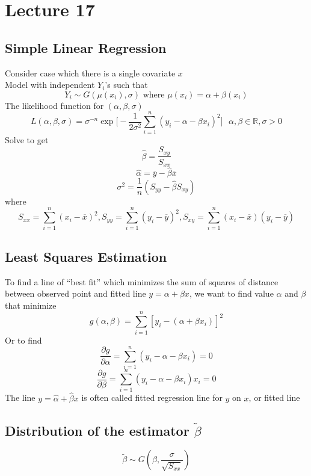 \documentclass[11pt]{article}
\newcommand{\R}{{\mathbb{R}}}
\begin{document}
\section{Lecture 17}
\subsection{Simple Linear Regression}
Consider case which there is a single covariate $x$ \\
Model with independent $Y_i$'s such that \[Y_i\sim G(\mu(x_i),\sigma)\text{ where }\mu(x_i)=\alpha+\beta(x_i)\]
The likelihood function for $(\alpha,\beta,\sigma)$
\[L(\alpha,\beta,\sigma) = \sigma^{-n}\exp\Big[-\frac{1}{2\sigma^2}\sum_{i=1}^{n}(y_i-\alpha-\beta x_i)^2\Big]\ \ \ \alpha,\beta\in\R, \sigma>0\]
Solve to get 
\[\hat{\beta} = \frac{S_{xy}}{S_{xx}}\]
\[\hat{\alpha} = \overline{y}-\hat{\beta}\overline{x}\]
\[\sigma^2 = \frac{1}{n}(S_{yy}-\hat{\beta}S_{xy})\]
where 
\[S_{xx}=\sum_{i=1}^{n}(x_i-\overline{x})^2, S_{yy} = \sum_{i=1}^{n}(y_i-\overline{y})^2, S_{xy} = \sum_{i=1}^{n}(x_i-\overline{x})(y_i-\overline{y})\]
\subsection{Least Squares Estimation}
To find a line of ``best fit'' which minimizes the sum of squares of distance between observed point and fitted line $y=\alpha+\beta x$, we want to find value $\alpha$ and $\beta$ that minimize 
\[g(\alpha,\beta) = \sum_{i=1}^{n}[y_i-(\alpha+\beta x_i)]^2\]
Or to find 
\[\frac{\partial g}{\partial \alpha} = \sum_{i=1}^{n}(y_i-\alpha-\beta x_i) = 0\]
\[\frac{\partial g}{\partial \beta} = \sum_{i=1}^{n}(y_i-\alpha-\beta x_i)x_i = 0\]
The line $y=\hat{\alpha} + \hat{\beta}x$ is often called fitted regression line for $y$ on $x$, or fitted line 
\subsection{Distribution of the estimator $\tilde{\beta}$}
\[\tilde{\beta}\sim G(\beta, \frac{\sigma}{\sqrt{S_{xx}}})\]
\end{document}

